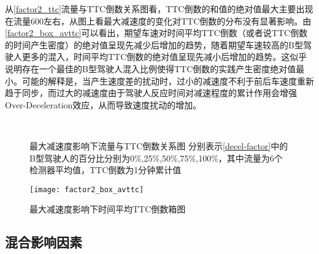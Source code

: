 从\autoref{factor2_ttc}流量与TTC倒数关系图看，TTC倒数的和值的绝对值最大主要出现在流量600左右，从图上看最大减速度的变化对TTC倒数的分布没有显著影响。由\autoref{factor2_box_avttc}可以看出，期望车速对时间平均TTC倒数（或者说TTC倒数的时间产生密度）的绝对值呈现先减少后增加的趋势，随着期望车速较高的B型驾驶人更多的混入，时间平均TTC倒数的绝对值呈现先减小后增加的趋势。这似乎说明存在一个最佳的B型驾驶人混入比例使得TTC倒数的实践产生密度绝对值最小。可能的解释是，当产生速度差的扰动时，过小的减速度不利于前后车速度重新趋于同步，而过大的减速度由于驾驶人反应时间对减速程度的累计作用会增强Over-Deceleration效应，从而导致速度扰动的增加。
\begin{figure}[htb]%
\centering
{}%
\\%
%
\caption[A set of four sub-floats.]{最大减速度影响下流量与TTC倒数关系图
分别表示\autoref{decel-factor}中的B型驾驶人的百分比分别为0\%,25\%,50\%,75\%,100\%，其中流量为6个检测器平均值，TTC倒数为1分钟累计值}%
\label{factor2_ttc}%
\end{figure}

\begin{figure}[htb]
\begin{center}
\texttt{[image: factor2\_box\_avttc]}
\caption{最大减速度影响下时间平均TTC倒数箱图}
\label{factor2_box_avttc}
\end{center}
\end{figure}

\FloatBarrier

\subsection{混合影响因素}

